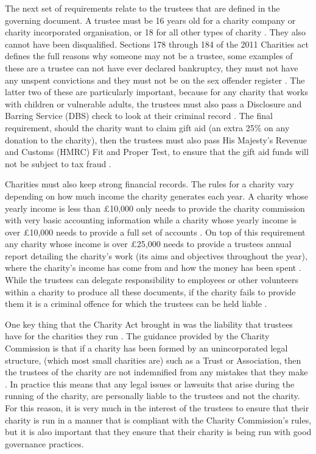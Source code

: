 \documentclass{UoYCSproject}
\begin{document}
The next set of requirements relate to the trustees that are defined in the governing document. A trustee must be 16 years old for a charity company or charity incorporated organisation, or 18 for all other types of charity \cite{essential_trustees_guide}. They also cannot have been disqualified. Sections 178 through 184 of the 2011 Charities act defines the full reasons why someone may not be a trustee, some examples of these are a trustee can not have ever declared bankruptcy, they must not have any unspent convictions and they must not be on the sex offender register \cite{gov_uk_disqualifying_reasons}. The latter two of these are particularly important, because for any charity that works with children or vulnerable adults, the trustees must also pass a Disclosure and Barring Service (DBS) check to look at their criminal record \cite{essential_trustees_guide}.  The final requirement, should the charity want to claim gift aid (an extra 25\% on any donation to the charity), then the trustees must also pass His Majesty's Revenue and Customs (HMRC) Fit and Proper Test, to ensure that the gift aid funds will not be subject to tax fraud \cite{hmrc_fit_and_proper_test}. 

Charities must also keep strong financial records. The rules for a charity vary depending on how much income the charity generates each year. A charity whose yearly income is less than £10,000 only needs to provide the charity commission with very basic accounting information while a charity whose yearly income is over £10,000 needs to provide a full set of accounts \cite{essential_trustees_guide}. On top of this requirement any charity whose income is over £25,000 needs to provide a trustees annual report detailing the charity's work (its aims and objectives throughout the year), where the charity's income has come from and how the money has been spent \cite{gov_uk_annual_report_doc}. While the trustees can delegate responsibility to employees or other volunteers within a charity to produce all these documents, if the charity fails to provide them it is a criminal offence for which the trustees can be held liable \cite{essential_trustees_guide}.

One key thing that the Charity Act brought in was the liability that trustees have for the charities they run \cite{charities_act_2011_section_191_liabilities}. The guidance provided by the Charity Commission is that if a charity has been formed by an unincorporated legal structure, (which most small charities are) such as a Trust or Association, then the trustees of the charity are not indemnified from any mistakes that they make \cite{essential_trustees_guide}. In practice this means that any legal issues or lawsuits that arise during the running of the charity, are personally liable to the trustees and not the charity. For this reason, it is very much in the interest of the trustees to ensure that their charity is run in a manner that is compliant with the Charity Commission's rules, but it is also important that they ensure that their charity is being run with good governance practices.
\end{document}
